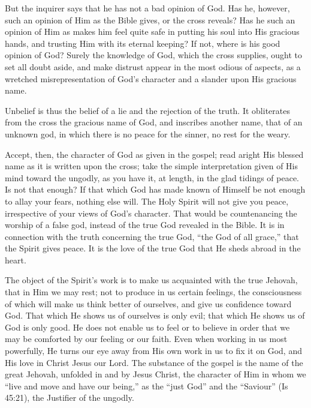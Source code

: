 \documentclass[
]{book}
\begin{document}
But the inquirer says that he has not a bad opinion of God. Has he, however, such an opinion of Him as the Bible gives, or the cross reveals? Has he such an opinion of Him as makes him feel quite safe in putting his soul into His gracious hands, and trusting Him with its eternal keeping? If not, where is his good opinion of God? Surely the knowledge of God, which the cross supplies, ought to set all doubt aside, and make distrust appear in the most odious of aspects, as a wretched misrepresentation of God's character and a slander upon His gracious name.

Unbelief is thus the belief of a lie and the rejection of the truth. It obliterates from the cross the gracious name of God, and inscribes another name, that of an unknown god, in which there is no peace for the sinner, no rest for the weary.

Accept, then, the character of God as given in the gospel; read aright His blessed name as it is written upon the cross; take the simple interpretation given of His mind toward the ungodly, as you have it, at length, in the glad tidings of peace. Is not that enough? If that which God has made known of Himself be not enough to allay your fears, nothing else will. The Holy Spirit will not give you peace, irrespective of your views of God's character. That would be countenancing the worship of a false god, instead of the true God revealed in the Bible. It is in connection with the truth concerning the true God, ``the God of all grace,'' that the Spirit gives peace. It is the love of the true God that He sheds abroad in the heart.

The object of the Spirit's work is to make us acquainted with the true Jehovah, that in Him we may rest; not to produce in us certain feelings, the consciousness of which will make us think better of ourselves, and give us confidence toward God. That which He shows us of ourselves is only evil; that which He shows us of God is only good. He does not enable us to feel or to believe in order that we may be comforted by our feeling or our faith. Even when working in us most powerfully, He turns our eye away from His own work in us to fix it on God, and His love in Christ Jesus our Lord. The substance of the gospel is the name of the great Jehovah, unfolded in and by Jesus Christ, the character of Him in whom we ``live and move and have our being,'' as the ``just God'' and the ``Saviour'' (Is 45:21), the Justifier of the ungodly.
\end{document}
